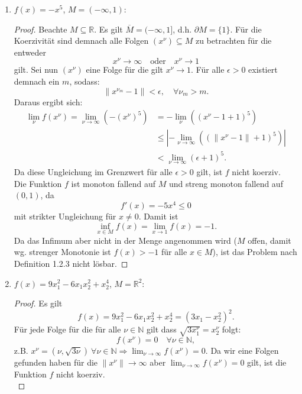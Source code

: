 \documentclass[12pt]{extreport} %
\newcommand{\N}{\mathbb{N}}
\newcommand{\R}{\mathbb{R}}
\theoremstyle{named}
\theoremstyle{nnamed}
\theoremstyle{itshape}
\theoremstyle{normal}
\begin{document}
	\begin{enumerate}
		\item $f(x) = - x^5$, $M =(- \infty, 1)$: ~\medskip
			\begin{proof}
			Beachte $M \subseteq \R$. Es gilt $\overline{M} = (-\infty, 1]$, d.h. $\partial M = \{ 1 \}$. Für die Koerzivität sind demnach alle Folgen $\left( x^\nu \right) \subseteq M$ zu betrachten für die entweder
			$$ x^\nu \longrightarrow \infty \quad \text{oder} \quad x^\nu \longrightarrow 1 $$
			gilt. Sei nun $(x^\nu)$ eine Folge für die gilt $x^\nu \rightarrow 1$. Für alle $\epsilon > 0$ existiert demnach ein $m$, sodass:
			$$ \| x^{\nu_m} - 1 \| < \epsilon, \quad \forall \nu_m > m. $$
			Daraus ergibt sich:
			\begin{align*}
				 \lim_\nu f(x^\nu) = \lim_{\nu \rightarrow \infty} \left( - \left(x^\nu \right)^5 \right) & = -  \lim_\nu \left( \left(x^\nu - 1 + 1 \right)^5 \right) \\
				 	& \leq \left| - \lim_{\nu \rightarrow \infty}  \left( \left( \| x^\nu -1 \| + 1 \right)^5 \right) \right| \\
				 	& < \lim_{\nu \rightarrow \infty}  \left( \epsilon + 1 \right)^5.  
			\end{align*}
			Da diese Ungleichung im Grenzwert für alle $\epsilon > 0$ gilt, ist $f$ nicht koerziv. ~\\ 
			
			Die Funktion $f$ ist monoton fallend auf $M$ und streng monoton fallend auf $(0, 1)$, da
			$$ f'(x) = - 5 x^4 \leq 0 $$
			mit strikter Ungleichung für $x \neq 0$. Damit ist 
			$$ \inf_{x \in M} f(x) = \lim_{x \rightarrow 1} f(x) = -1. $$
			Da das Infimum aber nicht in der Menge angenommen wird ($M$ offen, damit wg. strenger Monotonie ist $f(x) > -1$ für alle $x \in M$), ist das Problem nach Definition 1.2.3 nicht lösbar. 
			\end{proof}
		\item  $f(x) = 9 x_1^2 - 6 x_1 x_2^2 + x_2^4$, $M = \R^2$:
			\begin{proof}
			Es gilt
			$$ f(x) = 9 x_1^2 - 6 x_1 x_2^2 + x_2^4 = (3 x_1 - x_2^2)^2. $$
			Für jede Folge für die für alle $\nu \in \N$ gilt dass $\sqrt{3 x^\nu_1} = x^\nu_2$ folgt:
			$$ f(x^\nu) = 0 \quad \forall \nu \in \N, $$
			z.B. $x^\nu = (\nu, \sqrt{3\nu}) ~\forall \nu \in \N \Rightarrow \lim_{\nu \rightarrow \infty} f(x^\nu) = 0$. Da wir eine Folgen gefunden haben für die $\| x^\nu \| \rightarrow \infty$ aber $\lim_{\nu \rightarrow \infty} f(x^\nu) = 0$ gilt, ist die Funktion $f$ nicht koerziv. ~\\ 
			

\end{proof}
\end{enumerate}
\end{document}
